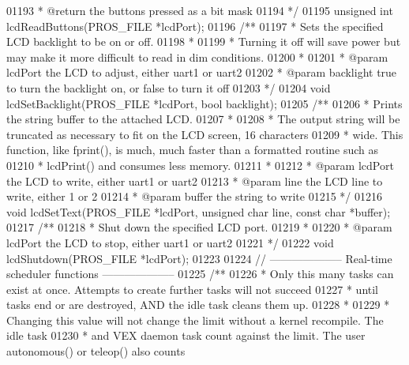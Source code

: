 \begin{DoxyCode}
{{{{{{{{{01193 \textcolor{comment}{ * @return the buttons pressed as a bit mask}
01194 \textcolor{comment}{ */}
01195 \textcolor{keywordtype}{unsigned} \textcolor{keywordtype}{int} lcdReadButtons(PROS_FILE *lcdPort);
01196 \textcolor{comment}{/**}
01197 \textcolor{comment}{ * Sets the specified LCD backlight to be on or off.}
01198 \textcolor{comment}{ *}
01199 \textcolor{comment}{ * Turning it off will save power but may make it more difficult to read in dim conditions.}
01200 \textcolor{comment}{ *}
01201 \textcolor{comment}{ * @param lcdPort the LCD to adjust, either uart1 or uart2}
01202 \textcolor{comment}{ * @param backlight true to turn the backlight on, or false to turn it off}
01203 \textcolor{comment}{ */}
01204 \textcolor{keywordtype}{void} lcdSetBacklight(PROS_FILE *lcdPort, \textcolor{keywordtype}{bool} backlight);
01205 \textcolor{comment}{/**}
01206 \textcolor{comment}{ * Prints the string buffer to the attached LCD.}
01207 \textcolor{comment}{ *}
01208 \textcolor{comment}{ * The output string will be truncated as necessary to fit on the LCD screen, 16 characters}
01209 \textcolor{comment}{ * wide. This function, like fprint(), is much, much faster than a formatted routine such as}
01210 \textcolor{comment}{ * lcdPrint() and consumes less memory.}
01211 \textcolor{comment}{ *}
01212 \textcolor{comment}{ * @param lcdPort the LCD to write, either uart1 or uart2}
01213 \textcolor{comment}{ * @param line the LCD line to write, either 1 or 2}
01214 \textcolor{comment}{ * @param buffer the string to write}
01215 \textcolor{comment}{ */}
01216 \textcolor{keywordtype}{void} lcdSetText(PROS_FILE *lcdPort, \textcolor{keywordtype}{unsigned} \textcolor{keywordtype}{char} line, \textcolor{keyword}{const} \textcolor{keywordtype}{char} *buffer);
01217 \textcolor{comment}{/**}
01218 \textcolor{comment}{ * Shut down the specified LCD port.}
01219 \textcolor{comment}{ *}
01220 \textcolor{comment}{ * @param lcdPort the LCD to stop, either uart1 or uart2}
01221 \textcolor{comment}{ */}
01222 \textcolor{keywordtype}{void} lcdShutdown(PROS_FILE *lcdPort);
01223 
01224 \textcolor{comment}{// -------------------- Real-time scheduler functions --------------------}
01225 \textcolor{comment}{/**}
01226 \textcolor{comment}{ * Only this many tasks can exist at once. Attempts to create further tasks will not succeed}
01227 \textcolor{comment}{ * until tasks end or are destroyed, AND the idle task cleans them up.}
01228 \textcolor{comment}{ *}
01229 \textcolor{comment}{ * Changing this value will not change the limit without a kernel recompile. The idle task}
01230 \textcolor{comment}{ * and VEX daemon task count against the limit. The user autonomous() or teleop() also counts}
}}}}}}}}}
\end{DoxyCode}
